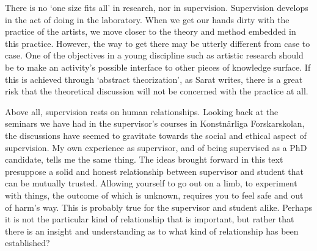 \documentclass[12pt]{article}
\begin{document}
There is no `one size fits all' in research, nor in supervision. Supervision develops in the act of doing in the laboratory. When we get our hands dirty with the practice of the artists, we move closer to the theory and method embedded in this practice. However, the way to get there may be utterly different from case to case. One of the objectives in a young discipline such as artistic research should be to make an activity's possible interface to other pieces of knowledge surface. If this is achieved through `abstract theorization', as Sarat writes, there is a great risk that the theoretical discussion will not be concerned with the practice at all. 



Above all, supervision rests on human relationships. Looking back at the seminars we have had in the supervisor's courses in Konstnärliga Forskarskolan, the discussions have seemed to gravitate towards the social and ethical aspect of supervision. My own experience as supervisor, and of being supervised as a PhD candidate, tells me the same thing. The ideas brought forward in this text presuppose a solid and honest relationship between supervisor and student that can be mutually trusted. Allowing yourself to go out on a limb, to experiment with things, the outcome of which is unknown, requires you to feel safe and out of harm's way. This is probably true for the supervisor and student alike. Perhaps it is not the particular kind of relationship that is important, but rather that there is an insight and understanding as to what kind of relationship has been established? 
\end{document}
